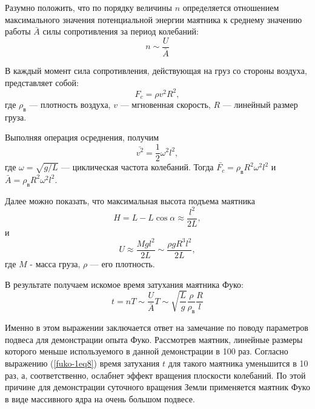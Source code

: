 \documentclass[14pt,a4paper,oneside]{extarticle}	%
\begin{document}
	Разумно положить, что по порядку величины $ n $ определяется отношением максимального значения потенциальной энергии маятника к среднему значению работы $ \bar{A} $ силы сопротивления за период колебаний:
	 \begin{equation}\label{fuko-1eq3}
	 n \sim \frac{U}{\bar{A}}
	 \end{equation}
	 
	В каждый момент сила сопротивления, действующая на груз со стороны воздуха, представляет собой:
	\begin{equation}\label{fuko-1eq4}
	F_{c} = \rho v^{2}R^{2},
	\end{equation}
	где $ \rho_{\text{в}} $ — плотность воздуха, $ v $ — мгновенная скорость, $ R $ — линейный размер груза.
	
	Выполняя операция осреднения, получим
	\begin{equation}\label{fuko-1eq5}
	\bar{v^{2}} = \frac{1}{2}\omega^{2}l^{2},
	\end{equation}
	где $ \omega = \sqrt{g/L} $ — циклическая частота колебаний.
	Тогда $ \bar{F_{c}}  = \rho_{\text{в}} R^{2}\omega^{2}l^{2} $ и $ \bar{A} = \rho_{\text{в}} R^{2}\omega^{2}l^{2} $.
	
	Далее можно показать, что максимальная высота подъема маятника
	\begin{equation}\label{fuko-1eq6}
	H = L - L \cos\alpha \approx \frac{l^{2}}{2L},
	\end{equation}
	и
	\begin{equation}\label{fuko-1eq7}
	U \approx\frac{ Mgl^2}{2L} \sim \frac{\rho g R^{3}l^{2}}{2L},
	\end{equation}
	где $ M $ - масса груза, $ \rho $ — его плотность. 
	
	В результате получаем искомое время затухания маятника Фуко:
	\begin{equation}\label{fuko-1eq8}
	t = nT \sim  \frac{U}{\bar{A}}T \sim\sqrt{\frac{L}{g}} \frac{\rho}{\rho_{\text{в}}}\frac{R}{l}
	\end{equation}
	
	Именно в этом выражении заключается ответ на замечание по поводу параметров подвеса для демонстрации опыта Фуко.
	Рассмотрев маятник, линейные размеры которого меньше используемого в данной демонстрации в 100 раз.
	Согласно выражению (\ref{fuko-1eq8}) время затухания $ t $ для такого маятника уменьшится в 10 раз, а, соответственно, ослабнет эффект вращения плоскости колебаний.
	По этой причине для демонстрации суточного вращения Земли применяется маятник Фуко в виде массивного ядра на очень большом подвесе.
	
\end{document}
